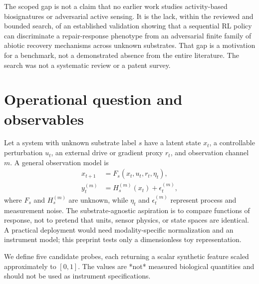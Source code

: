 \documentclass[11pt]{article}
\begin{document}
The scoped gap is not a claim that no earlier work studies activity-based biosignatures or adversarial active sensing. It is the lack, within the reviewed and bounded search, of an established validation showing that a sequential RL policy can discriminate a repair-response phenotype from an adversarial finite family of abiotic recovery mechanisms across unknown substrates. That gap is a motivation for a benchmark, not a demonstrated absence from the entire literature. The search was not a systematic review or a patent survey.

\section{Operational question and observables}
Let a system with unknown substrate label $s$ have a latent state $x_t$, a controllable perturbation $u_t$, an external drive or gradient proxy $r_t$, and observation channel $m$. A general observation model is
\begin{align}
 x_{t+1} &= F_s(x_t,u_t,r_t,\eta_t), \label{eq:dynamics}\\
 y_t^{(m)} &= H_s^{(m)}(x_t)+\epsilon_t^{(m)}, \label{eq:observation}
\end{align}
where $F_s$ and $H_s^{(m)}$ are unknown, while $\eta_t$ and $\epsilon_t^{(m)}$ represent process and measurement noise. The substrate-agnostic aspiration is to compare functions of response, not to pretend that units, sensor physics, or state spaces are identical. A practical deployment would need modality-specific normalization and an instrument model; this preprint tests only a dimensionless toy representation.

We define five candidate probes, each returning a scalar synthetic feature scaled approximately to $[0,1]$. The values are *not* measured biological quantities and should not be used as instrument specifications.
\end{document}
